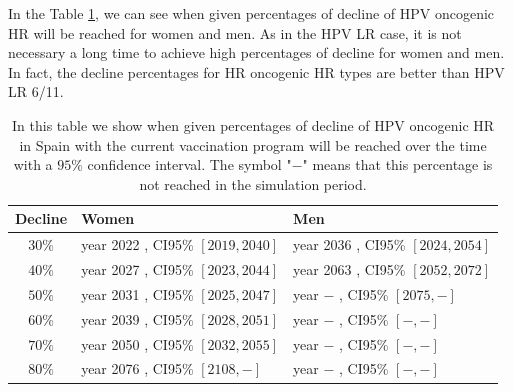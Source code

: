 In the Table \ref{tabla:oncoESP}, we can see when given percentages of decline of HPV oncogenic HR will be reached for women and men. As in the HPV LR case, it is not necessary a long time to achieve high percentages of decline for women and men. In fact, the decline percentages for HR oncogenic HR types are better than HPV LR 6/11.

\begin{table}[!h]
	\centering
	\begin{tabular}{c|ll}
		Decline & Women & Men \\ 
		\hline 
$ 30 \%$ & year  2022 , CI95\% $[ 2019 , 2040 ]$ & year  2036 , CI95\% $[ 2024 , 2054 ]$  \\
$ 40 \%$ & year  2027 , CI95\% $[ 2023 , 2044 ]$ & year  2063 , CI95\% $[ 2052 , 2072 ]$  \\
$ 50 \%$ & year  2031 , CI95\% $[ 2025 , 2047 ]$ & year  $-$ , CI95\% $[ 2075 , - ]$  \\
$ 60 \%$ & year  2039 , CI95\% $[ 2028 , 2051 ]$ & year  $-$ , CI95\% $[ - , - ]$  \\
$ 70 \%$ & year  2050 , CI95\% $[ 2032 , 2055 ]$ & year  $-$ , CI95\% $[ - , - ]$  \\
$ 80 \%$ & year  2076 , CI95\% $[ 2108 , - ]$ & year  $-$ , CI95\% $[ - , - ]$  \\
    \end{tabular} 
	\caption{In this table we show when given percentages of decline of HPV oncogenic HR in Spain with the current vaccination program will be reached over the time with a $95\%$ confidence interval. The symbol "$-$" means that this percentage is not reached in the simulation period. }
	\label{tabla:oncoESP}
\end{table}

